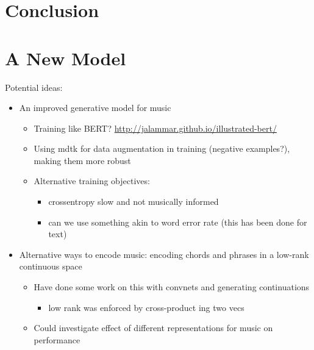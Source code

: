 \documentclass[12pt,a4paper,]{report}
\providecommand{\tightlist}{%
  \setlength{\itemsep}{0pt}\setlength{\parskip}{0pt}}
\begin{document}
\hypertarget{conclusion}{%
\chapter{Conclusion}\label{conclusion}}

\hypertarget{a-new-model}{%
\chapter{A New Model}\label{a-new-model}}

Potential ideas:

\begin{itemize}
\tightlist
\item
  An improved generative model for music

  \begin{itemize}
  \tightlist
  \item
    Training like BERT?
    \url{http://jalammar.github.io/illustrated-bert/}
  \item
    Using mdtk for data augmentation in training (negative examples?),
    making them more robust
  \item
    Alternative training objectives:

    \begin{itemize}
    \tightlist
    \item
      crossentropy slow and not musically informed
    \item
      can we use something akin to word error rate (this has been done
      for text)
    \end{itemize}
  \end{itemize}
\item
  Alternative ways to encode music: encoding chords and phrases in a
  low-rank continuous space

  \begin{itemize}
  \tightlist
  \item
    Have done some work on this with convnets and generating
    continuations

    \begin{itemize}
    \tightlist
    \item
      low rank was enforced by cross-product ing two vecs
    \end{itemize}
  \item
    Could investigate effect of different representations for music on
    performance
  \end{itemize}
\end{itemize}
\end{document}
